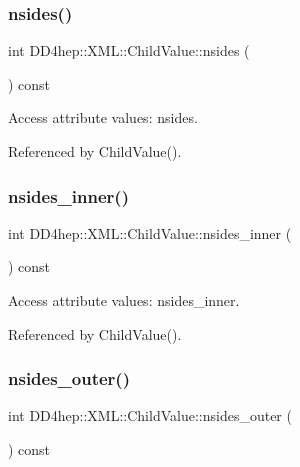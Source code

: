 \subsubsection{\texorpdfstring{nsides()}{nsides()}}
{\footnotesize\ttfamily int D\+D4hep\+::\+X\+M\+L\+::\+Child\+Value\+::nsides (\begin{DoxyParamCaption}{ }\end{DoxyParamCaption}) const}



Access attribute values\+: nsides. 



Referenced by Child\+Value().

\hypertarget{struct_d_d4hep_1_1_x_m_l_1_1_child_value_aa5f6774354d00d425835637387ae0136}{}\label{struct_d_d4hep_1_1_x_m_l_1_1_child_value_aa5f6774354d00d425835637387ae0136} 
\subsubsection{\texorpdfstring{nsides\+\_\+inner()}{nsides\_inner()}}
{\footnotesize\ttfamily int D\+D4hep\+::\+X\+M\+L\+::\+Child\+Value\+::nsides\+\_\+inner (\begin{DoxyParamCaption}{ }\end{DoxyParamCaption}) const}



Access attribute values\+: nsides\+\_\+inner. 



Referenced by Child\+Value().

\hypertarget{struct_d_d4hep_1_1_x_m_l_1_1_child_value_add672bdaff4ad842527db3c3a693da51}{}\label{struct_d_d4hep_1_1_x_m_l_1_1_child_value_add672bdaff4ad842527db3c3a693da51} 
\subsubsection{\texorpdfstring{nsides\+\_\+outer()}{nsides\_outer()}}
{\footnotesize\ttfamily int D\+D4hep\+::\+X\+M\+L\+::\+Child\+Value\+::nsides\+\_\+outer (\begin{DoxyParamCaption}{ }\end{DoxyParamCaption}) const}



